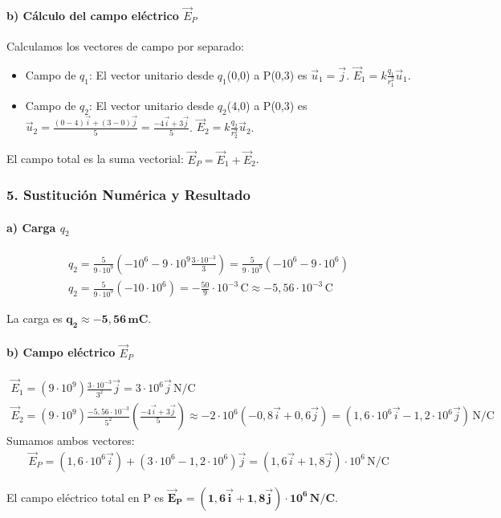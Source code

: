 \paragraph*{b) Cálculo del campo eléctrico $\vec{E}_P$}
Calculamos los vectores de campo por separado:
\begin{itemize}
    \item Campo de $q_1$: El vector unitario desde $q_1$(0,0) a P(0,3) es $\vec{u}_1 = \vec{j}$.
    $\vec{E}_1 = k\frac{q_1}{r_1^2}\vec{u}_1$.
    \item Campo de $q_2$: El vector unitario desde $q_2$(4,0) a P(0,3) es $\vec{u}_2 = \frac{(0-4)\vec{i}+(3-0)\vec{j}}{5} = \frac{-4\vec{i}+3\vec{j}}{5}$.
    $\vec{E}_2 = k\frac{q_2}{r_2^2}\vec{u}_2$.
\end{itemize}
El campo total es la suma vectorial: $\vec{E}_P = \vec{E}_1 + \vec{E}_2$.

\subsubsection*{5. Sustitución Numérica y Resultado}
\paragraph*{a) Carga $q_2$}
\begin{gather}
    q_2 = \frac{5}{9\cdot10^9}\left(-10^6 - 9\cdot10^9\frac{3\cdot10^{-3}}{3}\right) = \frac{5}{9\cdot10^9}\left(-10^6 - 9\cdot10^6\right) \nonumber \\
    q_2 = \frac{5}{9\cdot10^9}(-10\cdot10^6) = -\frac{50}{9}\cdot10^{-3}\,\text{C} \approx -5,56\cdot10^{-3}\,\text{C}
\end{gather}
\begin{cajaresultado}
La carga es $\boldsymbol{q_2 \approx -5,56\,\textbf{mC}}$.
\end{cajaresultado}

\paragraph*{b) Campo eléctrico $\vec{E}_P$}
\begin{gather}
    \vec{E}_1 = (9\cdot10^9)\frac{3\cdot10^{-3}}{3^2}\vec{j} = 3\cdot10^6\vec{j}\,\text{N/C} \\
    \vec{E}_2 = (9\cdot10^9)\frac{-5,56\cdot10^{-3}}{5^2}\left(\frac{-4\vec{i}+3\vec{j}}{5}\right) \approx -2\cdot10^6(-0,8\vec{i}+0,6\vec{j}) = (1,6\cdot10^6\vec{i} - 1,2\cdot10^6\vec{j})\,\text{N/C}
\end{gather}
Sumamos ambos vectores:
\begin{gather}
    \vec{E}_P = (1,6\cdot10^6\vec{i}) + (3\cdot10^6 - 1,2\cdot10^6)\vec{j} = (1,6\vec{i} + 1,8\vec{j})\cdot10^6\,\text{N/C}
\end{gather}
\begin{cajaresultado}
El campo eléctrico total en P es $\boldsymbol{\vec{E}_P = (1,6\vec{i} + 1,8\vec{j})\cdot10^6\,\textbf{N/C}}$.
\end{cajaresultado}

